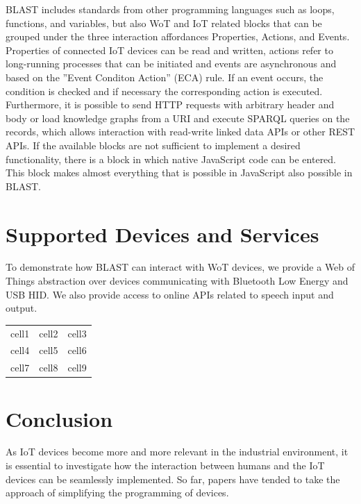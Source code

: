 \documentclass[runningheads]{llncs}
\begin{document}
BLAST includes standards from other programming languages such as loops, functions, and variables, but also WoT and IoT related blocks that can be grouped under the three interaction affordances Properties, Actions, and Events.
Properties of connected IoT devices can be read and written, actions refer to long-running processes that can be initiated and events are asynchronous and based on the ''Event Conditon Action'' (ECA) rule.
If an event occurs, the condition is checked and if necessary the corresponding action is executed.
Furthermore, it is possible to send HTTP requests with arbitrary header and body or load knowledge graphs from a URI and execute SPARQL queries on the records, which allows interaction with read-write linked data APIs or other REST APIs.
If the available blocks are not sufficient to implement a desired functionality, there is a block in which native JavaScript code can be entered.
This block makes almost everything that is possible in JavaScript also possible in BLAST. 

\section{Supported Devices and Services}

To demonstrate how BLAST can interact with WoT devices, we provide a Web of Things abstraction over devices communicating with Bluetooth Low Energy and USB HID.
We also provide access to online APIs related to speech input and output.

\begin{center}
\begin{tabular}{ |c|c|c| } 
 \hline
 cell1 & cell2 & cell3 \\ 
 cell4 & cell5 & cell6 \\ 
 cell7 & cell8 & cell9 \\ 
 \hline
\end{tabular}
\end{center}

\section{Conclusion}
As IoT devices become more and more relevant in the industrial environment, it is essential to investigate how the interaction between humans and the IoT devices can be seamlessly implemented.
So far, papers have tended to take the approach of simplifying the programming of devices.
\end{document}
